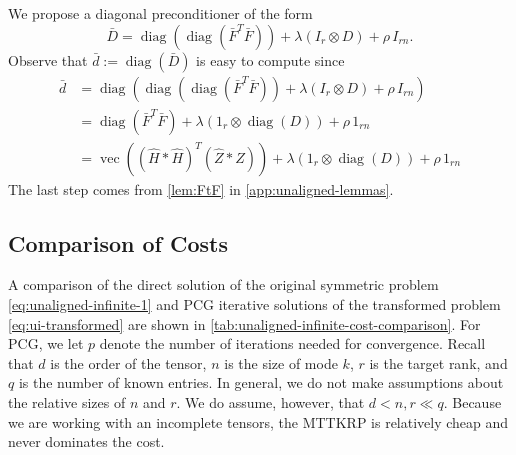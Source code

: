 \documentclass{article}
\DeclareMathOperator{\vecop}{vec}
\DeclareMathOperator{\diag}{diag}
\theoremstyle{plain} %
\begin{document}
We propose a diagonal preconditioner of the form
\begin{displaymath}
    \bar{D} = 
    \diag(\diag(\bar{F}^T \bar{F})) + \lambda (I_r \otimes D) + \rho \, I_{rn}.
\end{displaymath}
Observe that $\bar{d} := \diag(\bar{D})$ is easy to compute since
\begin{equation}\label{eq:preconditioner-ui}
    \begin{aligned}
    \bar{d} 
    & = \diag(
        \diag(\diag(\bar{F}^T \bar{F})) + \lambda (I_r \otimes D) + \rho \, I_{rn}
    ) \\
    &= \diag(\bar{F}^T \bar{F}) + \lambda (1_{r} \otimes \diag(D)) + \rho \, 1_{rn} \\
    &= \vecop( (\hat{H} \ast \hat{H})^T (\hat{Z} \ast \hat{Z})) + \lambda (1_{r} \otimes \diag(D)) + \rho \, 1_{rn} 
    \end{aligned}
\end{equation}
The last step comes from \cref{lem:FtF} in \cref{app:unaligned-lemmas}.

\subsection{Comparison of Costs}
\label{sec:cost-compare-ui}

A comparison of the direct solution of the original symmetric problem \cref{eq:unaligned-infinite-1}
and PCG iterative solutions of the 
transformed problem \cref{eq:ui-transformed} 
are shown in \cref{tab:unaligned-infinite-cost-comparison}.
For PCG, we let $p$ denote the number of iterations needed for convergence.
Recall that $d$ is the order of the tensor, 
$n$ is the size of mode $k$, $r$ is the target rank,
and $q$ is the number of known entries.
In general, we do not make assumptions about the relative sizes
of $n$ and $r$. We do assume, however, that
$d < n,r \ll q$.
Because we are working with an incomplete tensors, the MTTKRP is relatively cheap and never dominates the cost.
\end{document}
